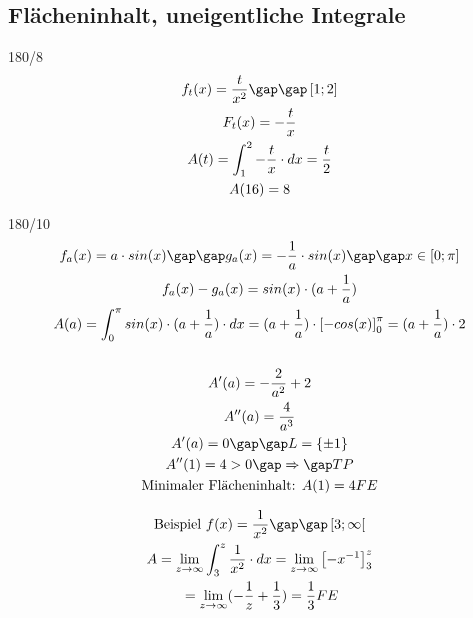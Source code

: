 \subsection{Flächeninhalt, uneigentliche Integrale}
\begin{exercise}{180/8}
  \begin{gather*}
    f_t(x) = \frac{t}{x^2} \gap\gap \left[1; 2\right] \\
    F_t(x) = -\frac{t}{x} \\
    A(t) = \int_1^2 -\frac{t}{x} \cdot dx = \frac{t}{2} \\
    A(16) = 8
  \end{gather*}
\end{exercise}
\begin{exercise}{180/10}
  \begin{gather*}
    f_a(x) = a \cdot sin(x) \gap\gap g_a(x) = -\frac{1}{a} \cdot sin(x) \gap\gap x \in \left[0; \pi\right] \\
    f_a(x) - g_a(x) = sin(x) \cdot (a + \frac{1}{a}) \\
    A(a) = \int_0^\pi sin(x) \cdot (a + \frac{1}{a}) \cdot dx = (a + \frac{1}{a}) \cdot \left[-cos(x)\right]_0^\pi = (a + \frac{1}{a}) \cdot 2 \\\\
    A'(a) = -\frac{2}{a^2} + 2 \\
    A''(a) = \frac{4}{a^3} \\
    A'(a) = 0 \gap\gap L = \{\pm1\} \\
    A''(1) = 4 > 0 \gap\Rightarrow\gap TP \\
    \text{Minimaler Flächeninhalt: } A(1) = 4FE
  \end{gather*}
\end{exercise}
\begin{gather*}
  \text{Beispiel } f(x) = \frac{1}{x^2} \gap\gap \left[3; \infty\right[ \\
  A = \lim\limits_{z \to \infty} \int_3^z \frac{1}{x^2} \cdot dx = \lim\limits_{z \to \infty} \left[-x^{-1}\right]_3^z \\
  \;= \lim\limits_{z \to \infty} (-\frac{1}{z} + \frac{1}{3}) = \frac{1}{3}FE
\end{gather*}
